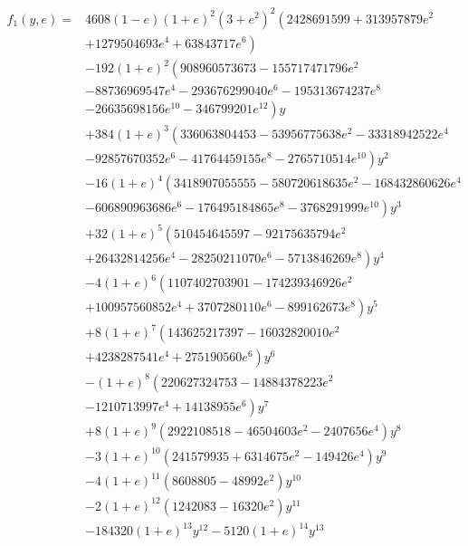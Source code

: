 \begin{align}
f_1(y, e) = {} & 4608 (1 - e) (1 + e)^2 \left(3 + e^2\right)^2 \left(2428691599+313957879 e^2 \right. \nonumber \\
 {} & + \left. 1279504693 e^4 + 63843717 e^6\right) \nonumber \\ 
 {} & - \left. 192 (1 + e)^2 \left(908960573673 - 155717471796 e^2 \right.\right. \nonumber \\
 {} & - \left. 88736969547 e^4 - 293676299040 e^6 - 195313674237 e^8 \right. \nonumber \\
 {} & - \left. 26635698156 e^{10} - 346799201 e^{12}\right) y \nonumber \\
 {} & + \left. 384 (1+e)^3 \left(336063804453 - 53956775638 e^2 - 33318942522 e^4 \right.\right. \nonumber \\
 {} & - \left. 92857670352 e^6 - 41764459155 e^8 - 2765710514 e^{10}\right) y^2 \nonumber \\
 {} & - \left. 16 (1 + e)^4 \left(3418907055555 - 580720618635 e^2 - 168432860626 e^4 \right.\right. \nonumber \\
 {} & - \left. 606890963686 e^6 - 176495184865 e^8 - 3768291999 e^{10}\right) y^3 \nonumber \\
 {} & + \left. 32 (1 + e)^5 \left(510454645597 - 92175635794 e^2 \right.\right. \nonumber \\
 {} & + \left. 26432814256 e^4 - 28250211070 e^6 - 5713846269 e^8\right) y^4 \nonumber \\
 {} & - \left. 4 (1 + e)^6 \left(1107402703901 - 174239346926 e^2 \right.\right. \nonumber \\
 {} & + \left. 100957560852 e^4 + 3707280110 e^6 - 899162673 e^8\right) y^5 \nonumber \\ 
 {} & + \left. 8 (1 + e)^7 \left(143625217397 - 16032820010 e^2 \right.\right. \nonumber \\
 {} & + \left. 4238287541 e^4 + 275190560 e^6\right) y^6 \nonumber \\
 {} & - \left. (1 + e)^8 \left(220627324753 - 14884378223 e^2 \right.\right. \nonumber \\
 {} & - \left. 1210713997 e^4 + 14138955 e^6\right) y^7 \nonumber \\
 {} & + \left. 8 (1 + e)^9 \left(2922108518 - 46504603 e^2 - 2407656 e^4\right) y^8 \right. \nonumber \\
 {} & - \left. 3 (1 + e)^{10} \left(241579935 + 6314675 e^2 - 149426 e^4\right) y^9 \right. \nonumber \\
 {} & - \left. 4 (1 + e)^{11} \left(8608805 - 48992 e^2\right) y^{10} \right. \nonumber \\
 {} & - \left. 2 (1 + e)^{12} \left(1242083 - 16320 e^2\right) y^{11} \right. \nonumber \\
 {} & - \left. 184320 (1 + e)^{13} y^{12} - 5120 (1 + e)^{14} y^{13} \right.
\end{align}
